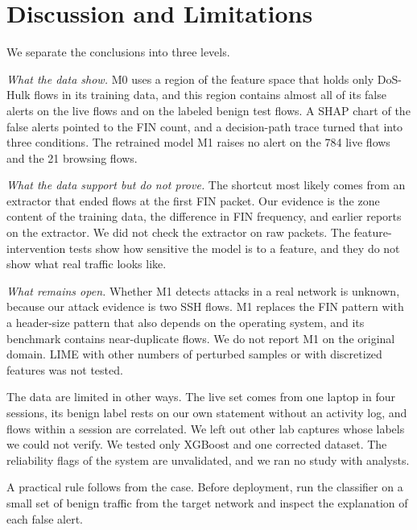 \documentclass[conference]{IEEEtran}
\begin{document}
\section{Discussion and Limitations}
We separate the conclusions into three levels.

\textit{What the data show.} M0 uses a region of the feature space that holds only DoS-Hulk flows in its training data, and this region contains almost all of its false alerts on the live flows and on the labeled benign test flows. A SHAP chart of the false alerts pointed to the FIN count, and a decision-path trace turned that into three conditions. The retrained model M1 raises no alert on the 784 live flows and the 21 browsing flows.

\textit{What the data support but do not prove.} The shortcut most likely comes from an extractor that ended flows at the first FIN packet. Our evidence is the zone content of the training data, the difference in FIN frequency, and earlier reports on the extractor. We did not check the extractor on raw packets. The feature-intervention tests show how sensitive the model is to a feature, and they do not show what real traffic looks like.

\textit{What remains open.} Whether M1 detects attacks in a real network is unknown, because our attack evidence is two SSH flows. M1 replaces the FIN pattern with a header-size pattern that also depends on the operating system, and its benchmark contains near-duplicate flows. We do not report M1 on the original domain. LIME with other numbers of perturbed samples or with discretized features was not tested.

The data are limited in other ways. The live set comes from one laptop in four sessions, its benign label rests on our own statement without an activity log, and flows within a session are correlated. We left out other lab captures whose labels we could not verify. We tested only XGBoost and one corrected dataset. The reliability flags of the system are unvalidated, and we ran no study with analysts.

A practical rule follows from the case. Before deployment, run the classifier on a small set of benign traffic from the target network and inspect the explanation of each false alert.
\end{document}
